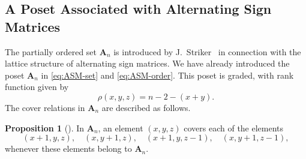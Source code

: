 \documentclass[a4paper,11pt]{amsart}
\theoremstyle{definition}
\newtheorem{prop}{Proposition}[section]
\numberwithin{equation}{section}
\def\ASM#1{\boldsymbol{A}_{#1}}
\begin{document}
\subsection{A Poset Associated with Alternating Sign Matrices}\label{ssc:posetASM}
%
%
The partially ordered set $\ASM{n}$ is introduced by J.~Striker~\cite{St}
in connection with 
the lattice structure of alternating sign matrices.
%
We have already introduced the poset $\ASM{n}$ in \eqref{eq:ASM-set} and \eqref{eq:ASM-order}.
This poset is graded, with rank function \cite[Proposition~3.4]{St} given by
\begin{equation}\label{eq:ASM-rank}
\rho(x,y,z)=n-2-(x+y).
\end{equation}
%
The cover relations in $\ASM{n}$ are described as follows.
%
\begin{prop}[\cite{St}]
In $\ASM{n}$,
an element $(x, y, z)$ covers each of the elements
\[
(x + 1, y, z),\quad (x, y + 1, z),\quad (x + 1, y, z - 1),\quad (x, y + 1, z-1),
\]
whenever these elements belong to $\ASM{n}$.
\end{prop}
%
%
\end{document}
